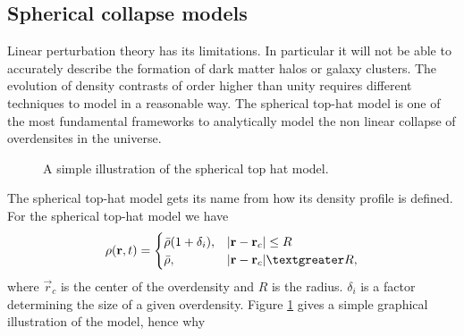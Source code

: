 \subsection{Spherical collapse models}
Linear perturbation theory has its limitations. In particular it will not be
able to accurately describe the formation of dark matter halos or galaxy
clusters. The evolution of density contrasts of order higher than unity requires
different techniques to model in a reasonable way. The spherical top-hat model
is one of the most fundamental frameworks to analytically model the non linear
collapse of overdensites in the universe.
\begin{figure}\label{fig:tophat}
    \caption{A simple illustration of the spherical top hat model.}
\end{figure}
The spherical top-hat model gets its name from how its density profile is
defined. For the spherical top-hat model we have
\begin{equation}
    \rho(\vec{r},t) =
    \begin{cases} 
        \bar{\rho}(1+\delta_i), & \vert\vec{r}-\vec{r}_c\vert\leq R \\
        \bar{\rho}, & \vert\vec{r}-\vec{r}_c\vert \textgreater R,
     \end{cases} 
\end{equation}
where $\vec{r}_c$ is the center of the overdensity and $R$ is the radius.
$\delta_i$ is a factor determining the size of a given overdensity. Figure
\ref{fig:tophat} gives a simple graphical illustration of the model, hence why
